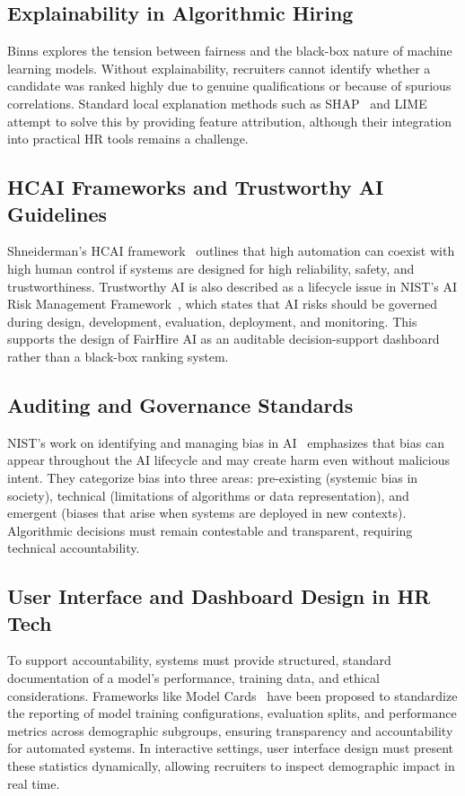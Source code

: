 \documentclass[sigconf]{acmart}
\begin{document}
\subsection{Explainability in Algorithmic Hiring}
Binns explores the tension between fairness and the black-box nature of machine learning models. Without explainability, recruiters cannot identify whether a candidate was ranked highly due to genuine qualifications or because of spurious correlations. Standard local explanation methods such as SHAP~\cite{lundberg2017} and LIME~\cite{ribeiro2016} attempt to solve this by providing feature attribution, although their integration into practical HR tools remains a challenge.

\subsection{HCAI Frameworks and Trustworthy AI Guidelines}
Shneiderman's HCAI framework~\cite{shneiderman2020} outlines that high automation can coexist with high human control if systems are designed for high reliability, safety, and trustworthiness. Trustworthy AI is also described as a lifecycle issue in NIST's AI Risk Management Framework~\cite{nist2023}, which states that AI risks should be governed during design, development, evaluation, deployment, and monitoring. This supports the design of FairHire AI as an auditable decision-support dashboard rather than a black-box ranking system.

\subsection{Auditing and Governance Standards}
NIST's work on identifying and managing bias in AI~\cite{schwartz2022} emphasizes that bias can appear throughout the AI lifecycle and may create harm even without malicious intent. They categorize bias into three areas: pre-existing (systemic bias in society), technical (limitations of algorithms or data representation), and emergent (biases that arise when systems are deployed in new contexts). Algorithmic decisions must remain contestable and transparent, requiring technical accountability.

\subsection{User Interface and Dashboard Design in HR Tech}
To support accountability, systems must provide structured, standard documentation of a model's performance, training data, and ethical considerations. Frameworks like Model Cards~\cite{mitchell2019} have been proposed to standardize the reporting of model training configurations, evaluation splits, and performance metrics across demographic subgroups, ensuring transparency and accountability for automated systems. In interactive settings, user interface design must present these statistics dynamically, allowing recruiters to inspect demographic impact in real time.
\end{document}
